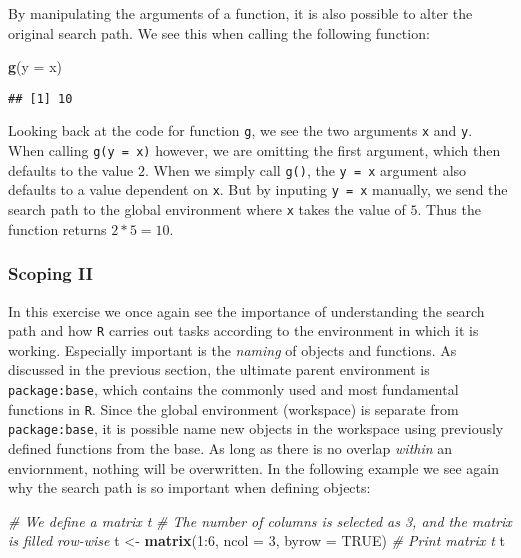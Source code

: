 \documentclass[11,]{article}
\newenvironment{Shaded}{\begin{snugshade}}{\end{snugshade}}
\newcommand{\KeywordTok}[1]{\textcolor[rgb]{0.13,0.29,0.53}{\textbf{{#1}}}}
\newcommand{\DataTypeTok}[1]{\textcolor[rgb]{0.13,0.29,0.53}{{#1}}}
\newcommand{\DecValTok}[1]{\textcolor[rgb]{0.00,0.00,0.81}{{#1}}}
\newcommand{\StringTok}[1]{\textcolor[rgb]{0.31,0.60,0.02}{{#1}}}
\newcommand{\CommentTok}[1]{\textcolor[rgb]{0.56,0.35,0.01}{\textit{{#1}}}}
\newcommand{\OtherTok}[1]{\textcolor[rgb]{0.56,0.35,0.01}{{#1}}}
\newcommand{\NormalTok}[1]{{#1}}
\begin{document}
By manipulating the arguments of a function, it is also possible to
alter the original search path. We see this when calling the following
function:

\begin{Shaded}
\begin{Highlighting}[]
\KeywordTok{g}\NormalTok{(}\DataTypeTok{y =} \NormalTok{x)}
\end{Highlighting}
\end{Shaded}

\begin{verbatim}
## [1] 10
\end{verbatim}

Looking back at the code for function \texttt{g}, we see the two
arguments \texttt{x} and \texttt{y}. When calling \texttt{g(y\ =\ x)}
however, we are omitting the first argument, which then defaults to the
value \(2\). When we simply call \texttt{g()}, the \texttt{y\ =\ x}
argument also defaults to a value dependent on \texttt{x}. But by
inputing \texttt{y\ =\ x} manually, we send the search path to the
global environment where \texttt{x} takes the value of \(5\). Thus the
function returns \(2*5=10\).

\subsubsection{Scoping II}\label{scoping-ii}

In this exercise we once again see the importance of understanding the
search path and how \texttt{R} carries out tasks according to the
environment in which it is working. Especially important is the
\emph{naming} of objects and functions. As discussed in the previous
section, the ultimate parent environment is \texttt{package:base}, which
contains the commonly used and most fundamental functions in \texttt{R}.
Since the global environment (workspace) is separate from
\texttt{package:base}, it is possible name new objects in the workspace
using previously defined functions from the base. As long as there is no
overlap \emph{within} an enviornment, nothing will be overwritten. In
the following example we see again why the search path is so important
when defining objects:

\begin{Shaded}
\begin{Highlighting}[]
\CommentTok{# We define a matrix t}
\CommentTok{# The number of columns is selected as 3, and the matrix is filled row-wise}
\NormalTok{t <-}\StringTok{ }\KeywordTok{matrix}\NormalTok{(}\DecValTok{1}\NormalTok{:}\DecValTok{6}\NormalTok{, }\DataTypeTok{ncol =} \DecValTok{3}\NormalTok{, }\DataTypeTok{byrow =} \OtherTok{TRUE}\NormalTok{)}
\CommentTok{# Print matrix t}
\NormalTok{t}
\end{Highlighting}
\end{Shaded}
\end{document}
